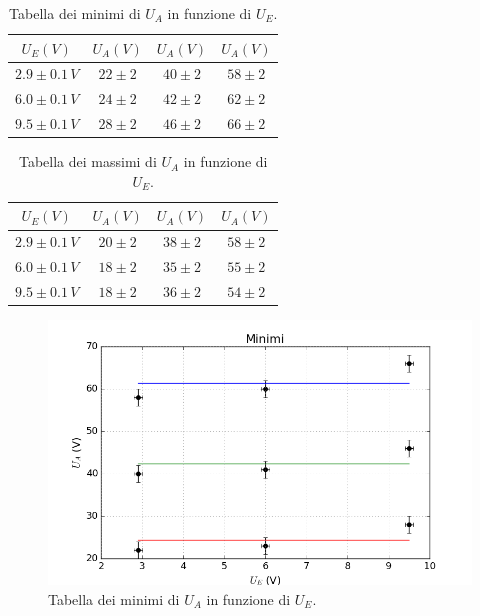 \documentclass[10pt,a4paper]{article}
\begin{document}
\begin{table}[!htb]
\centering
\begin{tabular}{|c|c|c|c|}
\hline 
$U_E (V)$ & $U_A (V)$ & $U_A (V)$ & $U_A (V)$ \\ 
\hline 
$2.9\pm0.1\,V$ & $22\pm2$ & $40\pm2$ & $58\pm2$ \\ 
\hline 
$6.0\pm0.1\,V$ & $24\pm2$ & $42\pm2$ & $62\pm2$ \\ 
\hline 
$9.5\pm0.1\,V$ & $28\pm2$ & $46\pm2$ & $66 \pm 2$ \\ 
\hline 
\end{tabular}
\caption{Tabella dei minimi di $U_A$ in funzione di $U_E$.\label{tabellaMinimi}}
 
\end{table}


\begin{table}[!htb]
\centering
\begin{tabular}{|c|c|c|c|}
\hline 
$U_E (V)$ & $U_A (V)$ & $U_A (V)$ & $U_A (V)$ \\ 
\hline 
$2.9\pm0.1\,V$ & $20\pm2$ & $38\pm2$ & $58\pm2$ \\ 
\hline 
$6.0\pm0.1\,V$ & $18\pm2$ & $35\pm2$ & $55\pm2$ \\ 
\hline 
$9.5\pm0.1\,V$ & $18\pm2$ & $36\pm2$ & $54\pm2$ \\ 
\hline 
\end{tabular} 
\caption{Tabella dei massimi di $U_A$ in funzione di $U_E$.\label{tabellaMassimi}}

\end{table}

\begin{figure}[!htb]
  \centering
  \includegraphics[scale=.7]{min.png}
\caption{Tabella dei minimi di $U_A$ in funzione di $U_E$.\label{graficoMin}}

\end{figure}
\end{document}
